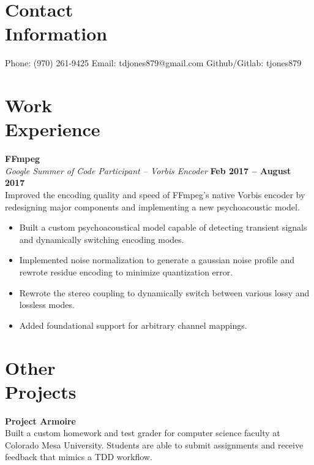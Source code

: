 \documentclass[margin,line]{resume}
\begin{document}
\begin{resume}
    \section{\mysidestyle Contact\\Information}

    Phone: (970) 261-9425 \hfill Email: tdjones879@gmail.com  \hfill Github/Gitlab: tjones879\vspace{0mm}\\\vspace{-4.5mm}

    \section{\mysidestyle Work\\Experience}

    \textbf{FFmpeg} \vspace{2mm}\\\vspace{1mm}%
    \textsl{Google Summer of Code Participant -- Vorbis Encoder} \hfill \textbf{Feb 2017 -- August 2017}\\
    Improved the encoding quality and speed of FFmpeg's native Vorbis
    encoder by redesigning major components and implementing a new
    psychoacoustic model.

	\begin{itemize}
	\item Built a custom psychoacoustical model capable of detecting
              transient signals and dynamically switching encoding modes.
	\item Implemented noise normalization to generate a gaussian noise
	      profile and rewrote residue encoding to minimize quantization
	      error.
	\item Rewrote the stereo coupling to dynamically switch between
	      various lossy and lossless modes.
	\item Added foundational support for arbitrary channel mappings.
	\end{itemize}

    \section{\mysidestyle Other\\Projects}

    \textbf{Project Armoire}\\
    Built a custom homework and test grader for computer science faculty at
    Colorado Mesa University. Students are able to submit assignments and receive
    feedback that mimics a TDD workflow.


\end{resume}
\end{document}
